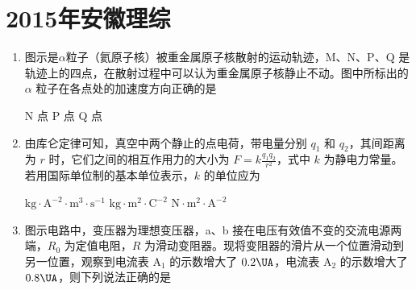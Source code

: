 \documentclass[\gkver]{gaokaozhenti}
\begin{document}
\chapter{2015年安徽理综}

\begin{enumerate}
\item
图示是$\alpha$粒子（氦原子核）被重金属原子核散射的运动轨迹，M、N、P、Q 是轨迹上的四点，在散射过程中可以认为重金属原子核静止不动。图中所标出的 $\alpha$ 粒子在各点处的加速度方向正确的是


{N 点}
{P 点}
{Q 点}


\item
由库仑定律可知，真空中两个静止的点电荷，带电量分别 $q_{1}$ 和 $q_{2}$，其间距离为 $r$ 时，它们之间的相互作用力的大小为 $F=k\frac{q_{1}q_{2}}{r^{2}}$，式中 $k$ 为静电力常量。若用国际单位制的基本单位表示，$k$ 的单位应为

{$\mathrm{kg}\cdot\mathrm{A}^{-2}\cdot\mathrm{m}^{3}\cdot\mathrm{s}^{-1}$}
{$\mathrm{kg}\cdot\mathrm{m}^{2}\cdot\mathrm{C}^{-2}$}
{$\mathrm{N}\cdot\mathrm{m}^{2}\cdot\mathrm{A}^{-2}$}


\item
图示电路中，变压器为理想变压器，a、b 接在电压有效值不变的交流电源两端，$R_{0}$ 为定值电阻，$R$ 为滑动变阻器。现将变阻器的滑片从一个位置滑动到另一位置，观察到电流表 A$_{1}$ 的示数增大了 $0.2\UA$，电流表 A$_{2}$ 的示数增大了 $0.8\UA$，则下列说法正确的是


\end{enumerate}
\end{document}
